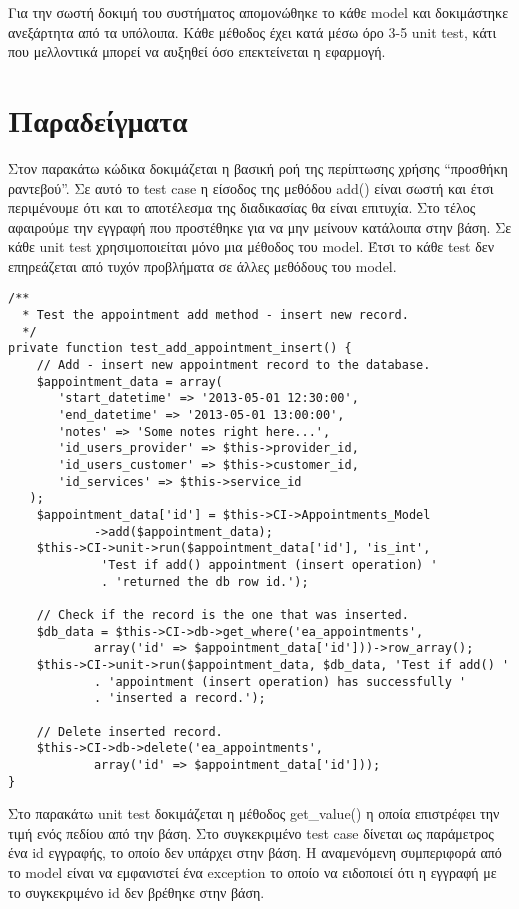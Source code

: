 Για την σωστή δοκιμή του συστήματος απομονώθηκε το κάθε model και δοκιμάστηκε ανεξάρτητα από τα υπόλοιπα. Κάθε μέθοδος έχει κατά μέσω όρο 3-5 unit test, κάτι που μελλοντικά μπορεί να αυξηθεί όσο επεκτείνεται η εφαρμογή. 

\section {Παραδείγματα} 
Στον παρακάτω κώδικα δοκιμάζεται η βασική ροή της περίπτωσης χρήσης “προσθήκη ραντεβού”. Σε αυτό το test case η είσοδος της μεθόδου add() είναι σωστή και έτσι περιμένουμε ότι και το αποτέλεσμα  της διαδικασίας θα είναι επιτυχία. Στο τέλος αφαιρούμε την εγγραφή που προστέθηκε για να μην μείνουν κατάλοιπα στην βάση.  Σε κάθε unit test χρησιμοποιείται μόνο μια μέθοδος του model. Έτσι το κάθε test δεν επηρεάζεται από τυχόν προβλήματα σε άλλες μεθόδους του model.

\begingroup
\fontsize{10pt}{12pt}
\begin{verbatim}
/**
  * Test the appointment add method - insert new record.
  */
private function test_add_appointment_insert() {
    // Add - insert new appointment record to the database.
    $appointment_data = array(
	   'start_datetime' => '2013-05-01 12:30:00',
	   'end_datetime' => '2013-05-01 13:00:00',
	   'notes' => 'Some notes right here...',
	   'id_users_provider' => $this->provider_id,
	   'id_users_customer' => $this->customer_id,
	   'id_services' => $this->service_id
   );
    $appointment_data['id'] = $this->CI->Appointments_Model
            ->add($appointment_data);
    $this->CI->unit->run($appointment_data['id'], 'is_int', 
             'Test if add() appointment (insert operation) '
			 . 'returned the db row id.');
        
    // Check if the record is the one that was inserted.
    $db_data = $this->CI->db->get_where('ea_appointments', 
            array('id' => $appointment_data['id']))->row_array();
    $this->CI->unit->run($appointment_data, $db_data, 'Test if add() '
			. 'appointment (insert operation) has successfully '
			. 'inserted a record.');

    // Delete inserted record.
    $this->CI->db->delete('ea_appointments', 
            array('id' => $appointment_data['id']));
}
\end{verbatim}
\endgroup
Στο παρακάτω unit test δοκιμάζεται η μέθοδος get\_value() η οποία επιστρέφει την τιμή ενός πεδίου από την βάση. Στο συγκεκριμένο test case δίνεται ως παράμετρος ένα id εγγραφής, το οποίο δεν υπάρχει στην βάση. Η αναμενόμενη συμπεριφορά από το model είναι να εμφανιστεί ένα exception το οποίο να ειδοποιεί ότι η εγγραφή με το συγκεκριμένο id δεν βρέθηκε στην βάση.

